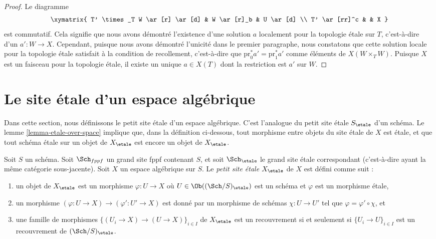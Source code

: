 \begin{proof}
Le diagramme
$$
\xymatrix{
T' \times_T W \ar[r] \ar[d] & W \ar[r]_b & U \ar[d] \\
T' \ar[rr]^c &  & X
}
$$
est commutatif. Cela signifie que nous avons démontré l'existence
d'une solution $a$ localement pour la topologie \'etale sur $T$, c'est-à-dire d'un $a' : W \to X$.
Cependant, puisque nous avons démontré l'unicité
dans le premier paragraphe, nous constatons que cette solution locale pour la topologie \'etale
satisfait à la condition de recollement, c'est-à-dire que
$\text{pr}_0^*a' = \text{pr}_1^*a'$ comme éléments de $X(W \times_T W)$.
Puisque $X$ est un faisceau pour la topologie \'etale, il existe un unique $a \in X(T)$ dont la restriction
est $a'$ sur $W$.
\end{proof}









\section{Le site \'etale d'un espace algébrique}
\label{section-etale-site}

\noindent
Dans cette section, nous définissons le petit site \'etale d'un espace algébrique.
C'est l'analogue du petit site \'etale $S_\etale$ d'un schéma.
Le lemme \ref{lemma-etale-over-space} implique que, dans la définition ci-dessous,
tout morphisme entre objets du site \'etale de $X$ est \'etale, et que
tout schéma \'etale sur un objet de $X_\etale$ est encore un objet de
$X_\etale$.

\begin{definition}
\label{definition-etale-site}
Soit $S$ un schéma.
Soit $\Sch_{fppf}$ un grand site fppf contenant $S$,
et soit $\Sch_\etale$ le grand site \'etale correspondant
(c'est-à-dire ayant la même catégorie sous-jacente).
Soit $X$ un espace algébrique sur $S$.
Le {\it petit site \'etale $X_\etale$} de $X$ est défini comme suit :
\begin{enumerate}
\item un objet de $X_\etale$ est un morphisme $\varphi : U \to X$
où $U \in \Ob((\Sch/S)_\etale)$ est un schéma et
$\varphi$ est un morphisme \'etale,
\item un morphisme $(\varphi : U \to X) \to (\varphi' : U' \to X)$
est donné par un morphisme de schémas $\chi : U \to U'$ tel que
$\varphi = \varphi' \circ \chi$, et
\item une famille de morphismes $\{(U_i \to X) \to (U \to X)\}_{i \in I}$
de $X_\etale$ est un recouvrement si et seulement si $\{U_i \to U\}_{i \in I}$
est un recouvrement de $(\Sch/S)_\etale$.
\end{enumerate}
\end{definition}

